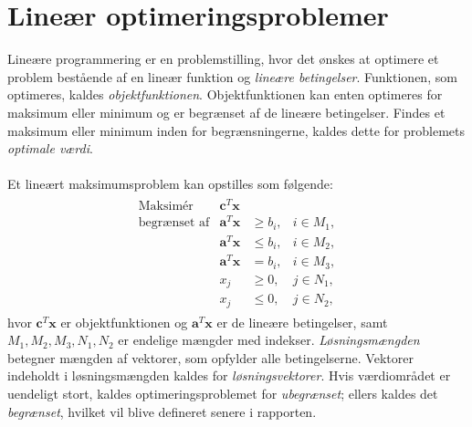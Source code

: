 \chapter{Lineær optimeringsproblemer}
%
Lineære programmering er en problemstilling, hvor det ønskes at optimere et problem bestående af en lineær funktion og \textit{lineære betingelser}.
Funktionen, som optimeres, kaldes \textit{objektfunktionen}.
Objektfunktionen kan enten optimeres for maksimum eller minimum og er begrænset af de lineære betingelser.
Findes et maksimum eller minimum inden for begrænsningerne, kaldes dette for problemets \textit{optimale værdi}.
\\\\
%
Et lineært maksimumsproblem kan opstilles som følgende:
%
\begin{align*}
\begin{array}{lrll}
\text{Maksimér}		&\textbf{c}^T\textbf{x}	&			&\\
\text{begrænset af}	&\textbf{a}^T\textbf{x}	&\geq b_i,	&i \in M_1,\\
					&\textbf{a}^T\textbf{x}	&\leq b_i,	&i \in M_2,\\
					&\textbf{a}^T\textbf{x}	& = b_i,	&i \in M_3,\\
					&x_j					&\geq 0,	&j \in N_1,\\
					&x_j					&\leq 0,	&j \in N_2,
\end{array}
\end{align*}
%
hvor $\textbf{c}^T\textbf{x}$ er objektfunktionen og $\textbf{a}^T\textbf{x}$ er de lineære betingelser, samt $M_1, M_2, M_3, N_1, N_2$ er endelige mængder med indekser.
\textit{Løsningsmængden} betegner mængden af vektorer, som opfylder alle betingelserne.
Vektorer indeholdt i løsningsmængden kaldes for \textit{løsningsvektorer}.
Hvis værdiområdet er uendeligt stort, kaldes optimeringsproblemet for \textit{ubegrænset}; ellers kaldes det \textit{begrænset}, hvilket vil blive defineret senere i rapporten. 
\\\\
%
